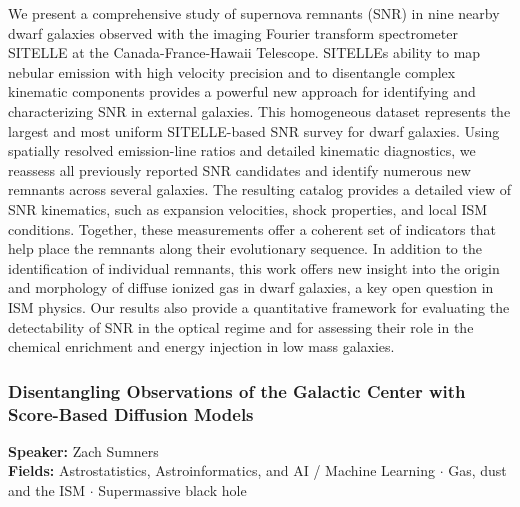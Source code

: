 We present a comprehensive study of supernova remnants (SNR) in nine nearby dwarf galaxies observed with the imaging Fourier transform spectrometer SITELLE at the Canada-France-Hawaii Telescope. SITELLEs ability to map nebular emission with high velocity precision and to disentangle complex kinematic components provides a powerful new approach for identifying and characterizing SNR in external galaxies. This homogeneous dataset represents the largest and most uniform SITELLE-based SNR survey for dwarf galaxies. Using spatially resolved emission-line ratios and detailed kinematic diagnostics, we reassess all previously reported SNR candidates and identify numerous new remnants across several galaxies. The resulting catalog provides a detailed view of SNR kinematics, such as expansion velocities, shock properties, and local ISM conditions. Together, these measurements offer a coherent set of indicators that help place the remnants along their evolutionary sequence. In addition to the identification of individual remnants, this work offers new insight into the origin and morphology of diffuse ionized gas in dwarf galaxies, a key open question in ISM physics. Our results also provide a quantitative framework for evaluating the detectability of SNR in the optical regime and for assessing their role in the chemical enrichment and energy injection in low mass galaxies.

\hypertarget{abstract-talk-124}{}\label{abstract-page-talk-124}
\subsubsection*{Disentangling Observations of the Galactic Center with Score-Based Diffusion Models}
\textbf{Speaker:} Zach Sumners\\
\textbf{Fields:} Astrostatistics, Astroinformatics, and AI / Machine Learning $\cdot$ Gas, dust and the ISM $\cdot$ Supermassive black hole

